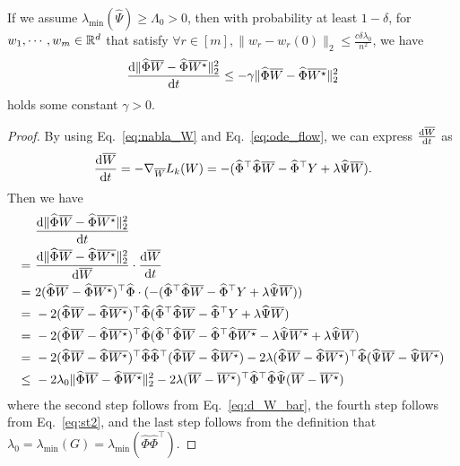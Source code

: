 \begin{lemma}\label{lem:gradient_flow}
If we assume $\lambda_{\min}(\hat{\Psi}) \geq \Lambda_0 > 0$, then with probability at least $1 - \delta$, for $w_1,\cdots,w_m \in\mathbb{R}^d$ that satisfy $\forall r\in [m], \|w_r - w_r(0)\|_2\leq \frac{c\delta \lambda_0}{n^2}$, we have
\begin{align*}
    \frac{\mathrm{d}\|\widehat{\Phi} \overline{W} -\widehat{\Phi} \overline{W^{\star}} \|_{2}^{2}}{\mathrm{d} t} \leq -\gamma \|\widehat{\Phi} \overline{W} -\widehat{\Phi} \overline{W^{\star}}\|_{2}^{2}
\end{align*}
holds some constant $\gamma > 0$.
\end{lemma}
\begin{proof}
By using Eq.~\eqref{eq:nabla_W} and Eq.~\eqref{eq:ode_flow}, we can express $\frac{\mathrm{d} \overline{W}}{\mathrm{d} t}$ as
\begin{align}
    \label{eq:d_W_bar}
    \frac{\mathrm{d} \overline{W}}{\mathrm{d} t} = - \nabla_{\overline{W}} L_k(W) = -( \widehat{\Phi}^{\top}\widehat{\Phi} \overline{W} - \widehat{\Phi}^{\top} Y + \lambda\widehat{\Psi} \overline{W}).
\end{align}
Then we have 
\begin{align}\label{eq:d_Phi_W}
    & ~ \frac{\mathrm{d} \|\widehat{\Phi} \overline{W} -\widehat{\Phi} \overline{W^{\star}} \|_{2}^{2}}{\mathrm{d}  t} \notag \\
    = & ~ \frac{\mathrm{d} \|\widehat{\Phi} \overline{W} -\widehat{\Phi} \overline{W^{\star}} \|_{2}^{2}}{\mathrm{d}  \overline{W}}\cdot\frac{\mathrm{d} \overline{W}}{\mathrm{d} t} \notag \\
    = & ~ 2(\widehat{\Phi} \overline{W} - \widehat{\Phi} \overline{W^{\star}})^{\top}\widehat{\Phi} \cdot (- ( \widehat{\Phi}^{\top}\widehat{\Phi} \overline{W} - \widehat{\Phi}^{\top}Y + \lambda\widehat{\Psi} \overline{W})) \notag \\
    = & ~ -2 (\widehat{\Phi} \overline{W} - \widehat{\Phi} \overline{W^{\star}})^{\top}\widehat{\Phi} ( \widehat{\Phi}^{\top}\widehat{\Phi} \overline{W} - \widehat{\Phi}^{\top}Y + \lambda\widehat{\Psi} \overline{W}) \notag \\
    = & ~ -2 (\widehat{\Phi} \overline{W} - \widehat{\Phi} \overline{W^{\star}})^{\top}\widehat{\Phi} (\widehat{\Phi}^{\top}\widehat{\Phi} \overline{W} - \widehat{\Phi}^{\top}\widehat{\Phi} \overline{W^{\star}} - \lambda\widehat{\Psi} \overline{W^{\star}} + \lambda\widehat{\Psi} \overline{W}) \notag \\
    = & ~ -2 (\widehat{\Phi} \overline{W} - \widehat{\Phi} \overline{W^{\star}})^{\top}\widehat{\Phi}\widehat{\Phi}^{\top}(\widehat{\Phi} \overline{W} - \widehat{\Phi} \overline{W^{\star}}) - 2\lambda(\widehat{\Phi} \overline{W} - \widehat{\Phi} \overline{W^{\star}})^{\top}\widehat{\Phi} (\widehat{\Psi} \overline{W} - \widehat{\Psi} \overline{W^{\star}}) \notag \\
    \leq & ~ -2 \lambda_0 \|\widehat{\Phi} \overline{W} - \widehat{\Phi} \overline{W^{\star}}\|_2^2 - 2\lambda (\overline{W} - \overline{W^{\star}})^{\top}\widehat{\Phi}^{\top} \widehat{\Phi} \widehat{\Psi} (\overline{W} - \overline{W^{\star}})
\end{align}
where the second step follows from Eq.~\eqref{eq:d_W_bar}, the fourth step follows from Eq.~\eqref{eq:st2}, and the last step follows from the definition that $\lambda_0 = \lambda_{\min}(G) = \lambda_{\min}(\hat{\Phi} \hat{\Phi}^\top)$.


\end{proof}
